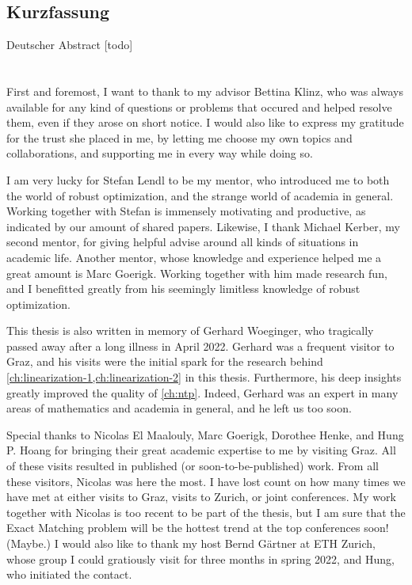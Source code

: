 \documentclass[twoside,openright,bibliography=totoc]{scrreprt}
\begin{document}
\begin{otherlanguage}{ngerman}
\chapter*{Kurzfassung}
Deutscher Abstract [todo]
\end{otherlanguage}




\cleardoublepage

\chapter*{}

First and foremost, I want to thank to my advisor Bettina Klinz, who was always available for any kind of questions or problems that occured and helped resolve them, even if they arose on short notice. I would also like to express my gratitude for the trust she placed in me, by letting me choose my own topics and collaborations, and supporting me in every way while doing so.

I am very lucky for Stefan Lendl to be my mentor, who introduced me to both the world of robust optimization, and the strange world of academia in general. Working together with Stefan is immensely motivating and productive, as indicated by our amount of shared papers. 
Likewise, I thank Michael Kerber, my second mentor, for giving helpful advise around all kinds of situations in academic life. 
Another mentor, whose knowledge and experience helped me a great amount is Marc Goerigk. Working together with him made research fun, and I benefitted greatly from his seemingly limitless knowledge of robust optimization.

This thesis is also written in memory of Gerhard Woeginger, who tragically passed away after a long illness in April 2022. Gerhard was a frequent visitor to Graz, and his visits were the initial spark for the research behind \cref{ch:linearization-1,ch:linearization-2} in this thesis. Furthermore, his deep insights greatly improved the quality of \cref{ch:ntp}. Indeed, Gerhard was an expert in many areas of mathematics and academia in general, and he left us too soon.

Special thanks to Nicolas El Maalouly, Marc Goerigk, Dorothee Henke, and Hung P. Hoang for bringing their great academic expertise to me by visiting Graz. All of these visits resulted in published (or soon-to-be-published) work. From all these visitors, Nicolas was here the most. I have lost count on how many times we have met at either visits to Graz, visits to Zurich, or joint conferences. My work together with Nicolas is too recent to be part of the thesis, but I am sure that the Exact Matching problem will be the hottest trend at the top conferences soon! (Maybe.)
I would also like to thank my host Bernd Gärtner at ETH Zurich, whose group I could gratiously visit for three months in spring 2022, and Hung, who initiated the contact.
\end{document}
